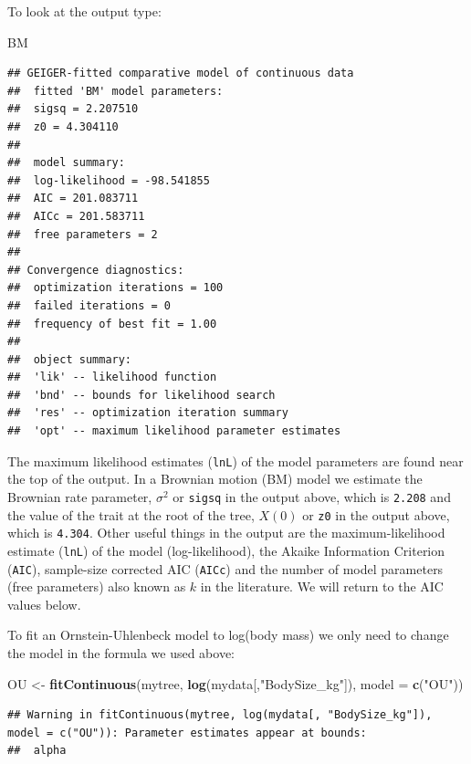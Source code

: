 \documentclass[]{book}
\newenvironment{Shaded}{\begin{snugshade}}{\end{snugshade}}
\newcommand{\KeywordTok}[1]{\textcolor[rgb]{0.13,0.29,0.53}{\textbf{{#1}}}}
\newcommand{\DataTypeTok}[1]{\textcolor[rgb]{0.13,0.29,0.53}{{#1}}}
\newcommand{\StringTok}[1]{\textcolor[rgb]{0.31,0.60,0.02}{{#1}}}
\newcommand{\NormalTok}[1]{{#1}}
\theoremstyle{definition}
\theoremstyle{definition}
\theoremstyle{definition}
\theoremstyle{remark}
\begin{document}
To look at the output type:

\begin{Shaded}
\begin{Highlighting}[]
\NormalTok{BM}
\end{Highlighting}
\end{Shaded}

\begin{verbatim}
## GEIGER-fitted comparative model of continuous data
##  fitted 'BM' model parameters:
##  sigsq = 2.207510
##  z0 = 4.304110
## 
##  model summary:
##  log-likelihood = -98.541855
##  AIC = 201.083711
##  AICc = 201.583711
##  free parameters = 2
## 
## Convergence diagnostics:
##  optimization iterations = 100
##  failed iterations = 0
##  frequency of best fit = 1.00
## 
##  object summary:
##  'lik' -- likelihood function
##  'bnd' -- bounds for likelihood search
##  'res' -- optimization iteration summary
##  'opt' -- maximum likelihood parameter estimates
\end{verbatim}

The maximum likelihood estimates (\texttt{lnL}) of the model parameters
are found near the top of the output. In a Brownian motion (BM) model we
estimate the Brownian rate parameter, \(\sigma^2\) or \texttt{sigsq} in
the output above, which is \texttt{2.208} and the value of the trait at
the root of the tree, \(X(0)\) or \texttt{z0} in the output above, which
is \texttt{4.304}. Other useful things in the output are the
maximum-likelihood estimate (\texttt{lnL}) of the model
(log-likelihood), the Akaike Information Criterion (\texttt{AIC}),
sample-size corrected AIC (\texttt{AICc}) and the number of model
parameters (free parameters) also known as \(k\) in the literature. We
will return to the AIC values below.

To fit an Ornstein-Uhlenbeck model to log(body mass) we only need to
change the model in the formula we used above:

\begin{Shaded}
\begin{Highlighting}[]
\NormalTok{OU <-}\StringTok{ }\KeywordTok{fitContinuous}\NormalTok{(mytree, }\KeywordTok{log}\NormalTok{(mydata[,}\StringTok{"BodySize_kg"}\NormalTok{]), }\DataTypeTok{model =} \KeywordTok{c}\NormalTok{(}\StringTok{"OU"}\NormalTok{))}
\end{Highlighting}
\end{Shaded}

\begin{verbatim}
## Warning in fitContinuous(mytree, log(mydata[, "BodySize_kg"]), model = c("OU")): Parameter estimates appear at bounds:
##  alpha
\end{verbatim}
\end{document}
